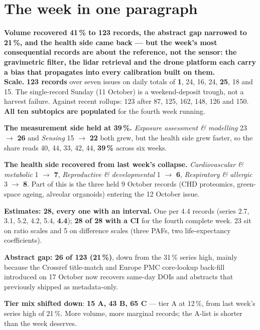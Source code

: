 \documentclass[10pt]{article}
\begin{document}
\vspace{6mm}

\section*{\sffamily\bfseries\color{Deep}The week in one paragraph}
\vspace{-1.5mm}{\color{Teal}\rule{\linewidth}{1.1pt}}\vspace{2.5mm}

\begin{keybox}
{\sffamily\bfseries\small\color{Deep}Volume recovered 41\,\% to 123 records, the abstract gap narrowed to
21\,\%, and the health side came back --- but the week's most consequential records are about the
reference, not the sensor: the gravimetric filter, the lidar retrieval and the drone platform each carry a
bias that propagates into every calibration built on them.}\\[1.4mm]
\footnotesize
\textbf{Scale.} \textbf{123 records} over seven issues on daily totals of \textbf{1}, 24, 16, 24,
\textbf{25}, 18 and 15. The single-record Sunday (11 October) is a weekend-deposit trough, not a harvest
failure. Against recent rollups: 123 after 87, 125, 162, 148, 126 and 150. \textbf{All ten subtopics are
populated} for the fourth week running.

\textbf{The measurement side held at 39\,\%.} \textit{Exposure assessment \& modelling} 23
$\rightarrow$ \textbf{26} and \textit{Sensing} 15 $\rightarrow$ \textbf{22} both grew, but the health
side grew faster, so the share reads 40, 44, 33, 42, 44, \textbf{39\,\%} across six weeks.

\textbf{The health side recovered from last week's collapse.} \textit{Cardiovascular \& metabolic}
1 $\rightarrow$ \textbf{7}, \textit{Reproductive \& developmental} 1 $\rightarrow$ \textbf{6},
\textit{Respiratory \& allergic} 3 $\rightarrow$ \textbf{8}. Part of this is the three held 9 October
records (CHD proteomics, green-space ageing, alveolar organoids) entering the 12 October issue.

\textbf{Estimates: 28, every one with an interval.} One per 4.4 records (series 2.7, 3.1, 5.2, 4.2, 5.4,
\textbf{4.4}); \textbf{28 of 28 with a CI} for the fourth complete week. 23 sit on ratio scales and 5 on
difference scales (three PAFs, two life-expectancy coefficients).

\textbf{Abstract gap: 26 of 123 (21\,\%)}, down from the 31\,\% series high, mainly because the
Crossref title-match and Europe PMC core-lookup back-fill introduced on 17 October now recovers same-day
DOIs and abstracts that previously shipped as metadata-only.

\textbf{Tier mix shifted down}: \textbf{15 A, 43 B, 65 C} --- tier A at 12\,\%, from last week's series
high of 21\,\%. More volume, more marginal records; the A-list is shorter than the week deserves.
\end{keybox}
\end{document}
